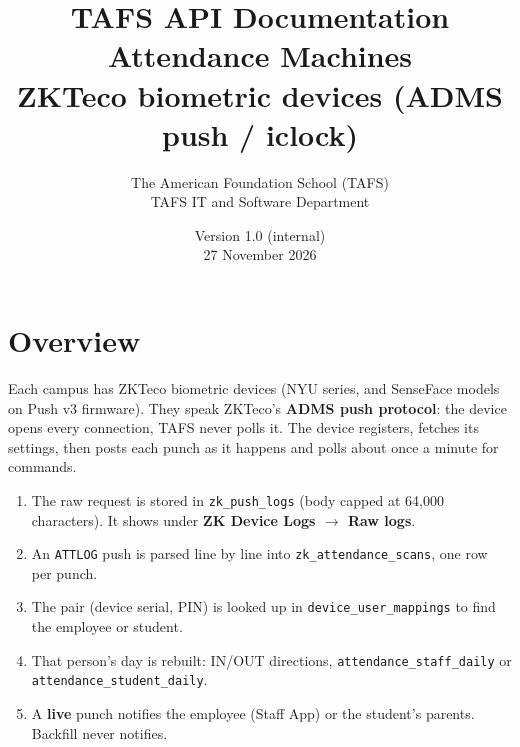\documentclass[11pt]{article}
\title{\textbf{TAFS API Documentation} \\[4pt]
\large Attendance Machines \\ ZKTeco biometric devices (ADMS push / iclock)}
\author{The American Foundation School (TAFS) \\ TAFS IT and Software Department}
\date{Version 1.0 (internal) \\ 27 November 2026}
\begin{document}
\begin{titlepage}
\vspace*{\fill}
{\let\newpage\relax\maketitle}
\thispagestyle{empty}
\vspace*{\fill}
\internalonly
\end{titlepage}

\tableofcontents
\newpage

\section{Overview}
Each campus has ZKTeco biometric devices (NYU series, and SenseFace models on Push v3 firmware). They speak ZKTeco's
\textbf{ADMS push protocol}: the device opens every connection, TAFS never polls it. The device registers, fetches its
settings, then posts each punch as it happens and polls about once a minute for commands.
\begin{enumerate}[nosep]
  \item The raw request is stored in \texttt{zk\_push\_logs} (body capped at 64,000 characters). It shows under
        \textbf{ZK Device Logs $\rightarrow$ Raw logs}.
  \item An \texttt{ATTLOG} push is parsed line by line into \texttt{zk\_attendance\_scans}, one row per punch.
  \item The pair (device serial, PIN) is looked up in \texttt{device\_user\_mappings} to find the employee or student.
  \item That person's day is rebuilt: IN/OUT directions, \texttt{attendance\_staff\_daily} or
        \texttt{attendance\_student\_daily}.
  \item A \textbf{live} punch notifies the employee (Staff App) or the student's parents. Backfill never notifies.
\end{enumerate}
\end{document}
